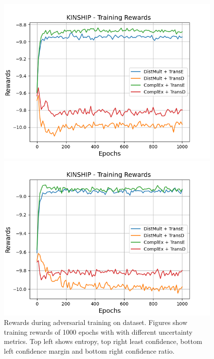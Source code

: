 \begin{figure}[H]
\begin{minipage}{.5\textwidth}
    \end{minipage}
    \begin{minipage}{.5\textwidth}
      \centering
      \includegraphics[width=0.9\linewidth]{figures/results/gan_train/not_pretrained/uncertainty/max_distribution/confidence_margin/kinship/1k_epochs/uncertainty_kinship_rew.png}
    \end{minipage}%
    \begin{minipage}{.5\textwidth}
      \centering
      \includegraphics[width=0.9\linewidth]{figures/results/gan_train/not_pretrained/uncertainty/max_distribution/confidence_ratio/kinship/1k_epochs/uncertainty_kinship_rew.png}
    \end{minipage}%
    \caption{Rewards during adversarial training on \kinship dataset. 
    Figures show training rewards of 1000 epochs with \ussoftmax with different uncertainty metrics.
    Top left shows entropy, top right least confidence, 
    bottom left confidence margin and bottom right confidence ratio.}
    \label{fig:advtrain_metrics_kinship_rew}
\end{figure}